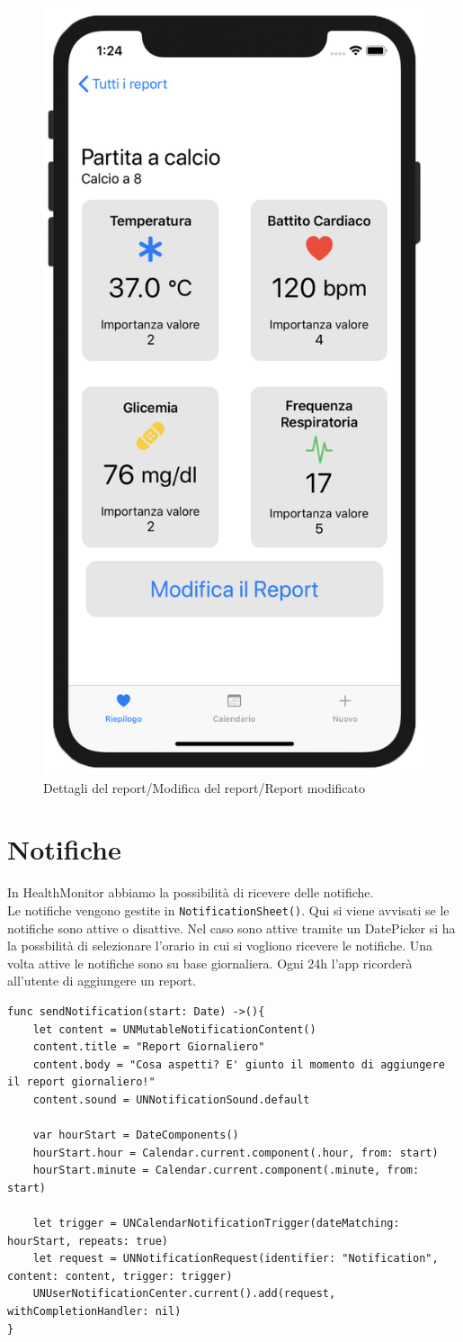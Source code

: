 \documentclass{article}
\begin{document}
\begin{figure}[htp]
\includegraphics[width=.32\textwidth]{img/ReportView1.png}

\caption{Dettagli del report/Modifica del report/Report modificato}
\label{fig:figure5}

\end{figure}



\newpage
\section{Notifiche}

In HealthMonitor abbiamo la possibilità di ricevere delle notifiche.\\
Le notifiche vengono gestite in \texttt{NotificationSheet()}. Qui si viene avvisati se le notifiche sono attive o disattive. Nel caso sono attive tramite un DatePicker si ha la possbilità di selezionare l'orario in cui si vogliono ricevere le notifiche. Una volta attive le notifiche sono su base giornaliera. Ogni 24h l'app ricorderà all'utente di aggiungere un report. 

\begin{lstlisting}
func sendNotification(start: Date) ->(){
	let content = UNMutableNotificationContent()
	content.title = "Report Giornaliero"
	content.body = "Cosa aspetti? E' giunto il momento di aggiungere il report giornaliero!"
	content.sound = UNNotificationSound.default
        
	var hourStart = DateComponents()
	hourStart.hour = Calendar.current.component(.hour, from: start)
	hourStart.minute = Calendar.current.component(.minute, from: start)
        
	let trigger = UNCalendarNotificationTrigger(dateMatching: hourStart, repeats: true)
	let request = UNNotificationRequest(identifier: "Notification", content: content, trigger: trigger)
	UNUserNotificationCenter.current().add(request, withCompletionHandler: nil)
}    
\end{lstlisting}
\end{document}
